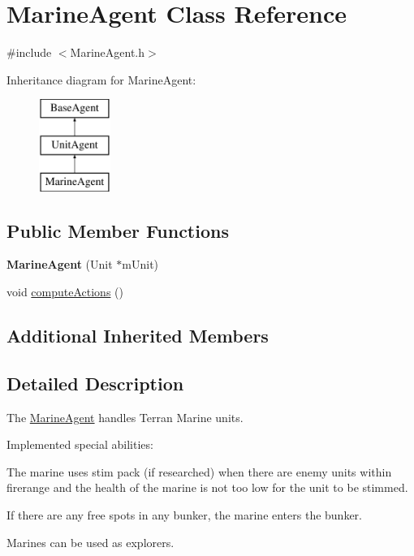\hypertarget{class_marine_agent}{\section{Marine\-Agent Class Reference}
\label{class_marine_agent}
}


{\ttfamily \#include $<$Marine\-Agent.\-h$>$}

Inheritance diagram for Marine\-Agent\-:\begin{figure}[H]
\begin{center}
\leavevmode
\includegraphics[height=3.000000cm]{class_marine_agent}
\end{center}
\end{figure}
\subsection*{Public Member Functions}
\begin{DoxyCompactItemize}
\item 
\hypertarget{class_marine_agent_a6bc21f0b79fc588d4d6119ee45f9dc47}{{\bfseries Marine\-Agent} (Unit $\ast$m\-Unit)}\label{class_marine_agent_a6bc21f0b79fc588d4d6119ee45f9dc47}

\item 
void \hyperlink{class_marine_agent_aa3aa92fd667bb693e11820b084b80f22}{compute\-Actions} ()
\end{DoxyCompactItemize}
\subsection*{Additional Inherited Members}


\subsection{Detailed Description}
The \hyperlink{class_marine_agent}{Marine\-Agent} handles Terran Marine units.

Implemented special abilities\-:
\begin{DoxyItemize}
\item The marine uses stim pack (if researched) when there are enemy units within firerange and the health of the marine is not too low for the unit to be stimmed.
\item If there are any free spots in any bunker, the marine enters the bunker.
\item Marines can be used as explorers.
\end{DoxyItemize}

